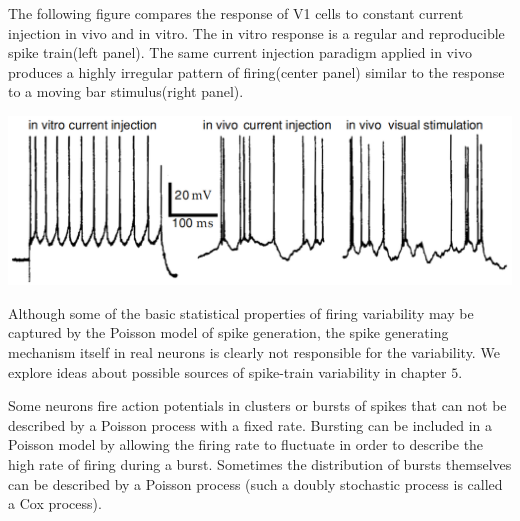 \begin{exm}
  The following figure compares the response of V1 cells to constant current injection in vivo and in vitro. The in vitro response is a regular and reproducible spike train(left panel). The same current injection paradigm applied in vivo produces a highly irregular pattern of firing(center panel) similar to the response to a moving bar stimulus(right panel).
  \begin{center}
    \label{fig:1.17}    
    \includegraphics[scale = 0.2]{png/Fig_1_17.png}\\
  \end{center}
\end{exm}

\begin{rem}
  Although some of the basic statistical properties of firing variability may be captured by the Poisson model of spike generation,  the spike generating mechanism itself in real neurons is clearly not responsible for the variability. We explore ideas about possible sources of spike-train variability in chapter $5$.
\end{rem}

\begin{rem}
    Some neurons fire action potentials in clusters or bursts of spikes that can not be described by a Poisson process with a fixed rate. Bursting can be included in a Poisson model by allowing the firing rate to fluctuate in order to describe the high rate of firing during a burst. Sometimes the distribution of bursts themselves can be described by a Poisson process (such a doubly stochastic process is called a Cox process).    
\end{rem}





